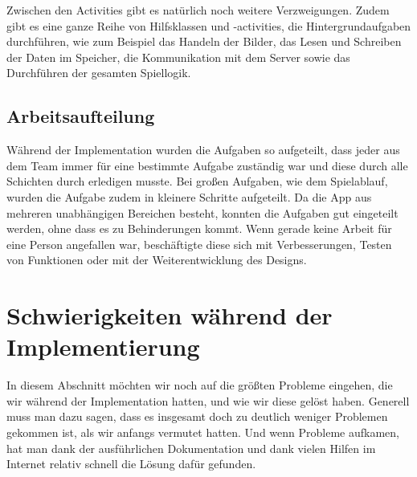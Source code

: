 Zwischen den Activities gibt es natürlich noch weitere Verzweigungen. Zudem gibt es eine ganze Reihe von Hilfsklassen und -activities, die Hintergrundaufgaben durchführen, wie zum Beispiel das Handeln der Bilder, das Lesen und Schreiben der Daten im Speicher, die Kommunikation mit dem Server sowie das Durchführen der gesamten Spiellogik.

\subsection{Arbeitsaufteilung}
\label{sec:implementierung:architektur:arbeitsaufteilung }

Während der Implementation wurden die Aufgaben so aufgeteilt, dass jeder aus dem Team immer für eine bestimmte Aufgabe zuständig war und diese durch alle Schichten durch erledigen musste. Bei großen Aufgaben, wie dem Spielablauf, wurden die Aufgabe zudem in kleinere Schritte aufgeteilt. Da die App aus mehreren unabhängigen Bereichen besteht, konnten die Aufgaben gut eingeteilt werden, ohne dass es zu Behinderungen kommt. Wenn gerade keine Arbeit für eine Person angefallen war, beschäftigte diese sich mit Verbesserungen, Testen von Funktionen oder mit der Weiterentwicklung des Designs.

\section{Schwierigkeiten während der Implementierung}
\label{sec:implementierung:schwierigkeiten }	

In diesem Abschnitt möchten wir noch auf die größten Probleme eingehen, die wir während der Implementation hatten, und wie wir diese gelöst haben. Generell muss man dazu sagen, dass es insgesamt doch zu deutlich weniger Problemen gekommen ist, als wir anfangs vermutet hatten. Und wenn Probleme aufkamen, hat man dank der ausführlichen Dokumentation und dank vielen Hilfen im Internet relativ schnell die Lösung dafür gefunden.

